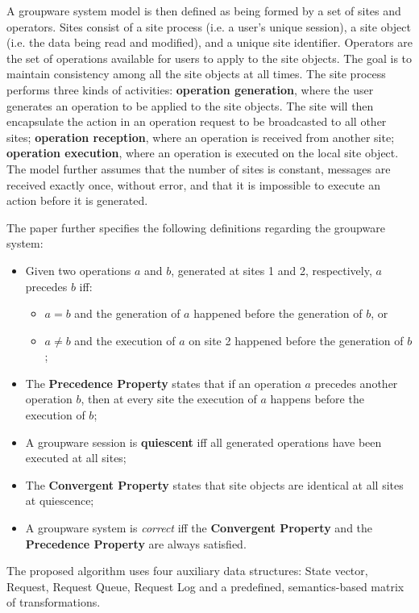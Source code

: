 A groupware system model is then defined as being formed by a set of sites and operators. Sites consist of a site process (i.e. a user's unique session), a site object (i.e. the data being read and modified), and a unique site identifier. Operators are the set of operations available for users to apply to the site objects. The goal is to maintain consistency among all the site objects at all times. The site process performs three kinds of activities: \textbf{operation generation}, where the user generates an operation to be applied to the site objects. The site will then encapsulate the action in an operation request to be broadcasted to all other sites; \textbf{operation reception}, where an operation is received from another site; \textbf{operation execution}, where an operation is executed on the local site object. The model further assumes that the number of sites is constant, messages are received exactly once, without error, and that it is impossible to execute an action before it is generated.

The paper further specifies the following definitions regarding the groupware system:

\begin{itemize}
    \item Given two operations $a$ and $b$, generated at sites 1 and 2, respectively, $a$ precedes $b$ iff:
    \begin{itemize}
        \item $a = b$ and the generation of $a$ happened before the generation of $b$, or
        \item $a \neq b$ and the execution of $a$ on site 2 happened before the generation of $b$;
    \end{itemize}
    \item The \textbf{Precedence Property} states that if an operation $a$ precedes another operation $b$, then at every site the execution of $a$ happens before the execution of $b$;
    \item A groupware session is \textbf{quiescent} iff all generated operations have been executed at all sites;
    \item The \textbf{Convergent Property} states that site objects are identical at all sites at quiescence;
    \item A groupware system is \textit{correct} iff the \textbf{Convergent Property} and the \textbf{Precedence Property} are always satisfied.
\end{itemize}

The proposed algorithm uses four auxiliary data structures: State vector, Request, Request Queue, Request Log and a predefined, semantics-based matrix of transformations. 

